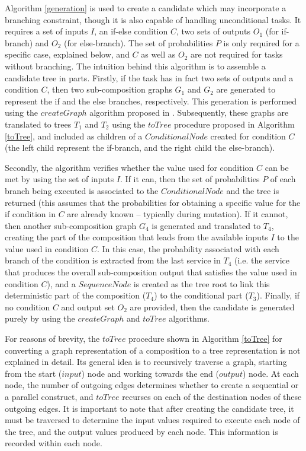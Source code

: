 \documentclass[conference]{IEEEtran}
\begin{document}
Algorithm \ref{generation} is used to create a candidate which may incorporate a branching constraint, though it is also capable of handling unconditional tasks. It requires a
set of inputs $I$, an if-else condition $C$, two sets of outputs $O_1$ (for if-branch) and $O_2$ (for else-branch). The set of probabilities $P$ is only required for a specific case, explained below, and $C$ as well as $O_2$ are not required for tasks without branching. The intuition behind this algorithm is to assemble a candidate tree in parts. Firstly, if the task has in fact two sets of outputs and a condition $C$, then two sub-composition graphs $G_1$ and $G_2$ are generated to represent the if and the else branches, respectively. This generation is performed using the $createGraph$ algorithm proposed in \cite{wang2013genetic}. Subsequently, these graphs are translated to trees $T_1$ and $T_2$ using the $toTree$ procedure proposed in Algorithm \ref{toTree}, and included as children of a $ConditionalNode$ created for condition $C$ (the left child represent the if-branch, and the right child the else-branch).

Secondly, the algorithm verifies whether the value used for condition $C$ can be met by using the set of inputs $I$. If it can, then the set of probabilities $P$ of each branch being executed is associated to the $ConditionalNode$ and the tree is returned (this assumes that the probabilities for obtaining a specific value for the if condition in $C$ are already known -- typically during mutation). If it cannot, then another sub-composition graph $G_4$ is generated and translated to $T_4$, creating the part of the composition that leads from the available inputs $I$ to the value used in condition $C$. In this case, the probability associated with each branch of the condition is extracted from the last service in $T_4$ (i.e. the service that produces the overall sub-composition output that satisfies the value used in condition $C$), and a $SequenceNode$ is created as the tree root to link this deterministic part of the composition ($T_4$) to the conditional part ($T_3$). Finally, if no condition $C$ and output set $O_2$ are provided, then the candidate is generated purely by using the $createGraph$ and $toTree$ algorithms. 

For reasons of brevity, the $toTree$ procedure shown in Algorithm \ref{toTree} for converting a graph representation of a composition to a tree representation is not explained in detail. Its general idea is to recursively traverse a graph, starting from the start ($input$) node and working towards the end ($output$) node. At each node, the number of outgoing edges determines whether to create a sequential or a parallel construct, and $toTree$ recurses on each of the destination nodes of these outgoing edges. It is important to note that after creating the candidate tree, it must be traversed to determine the input values required to execute each node of the tree, and the output values produced by each node. This information is recorded within each node.
\end{document}
